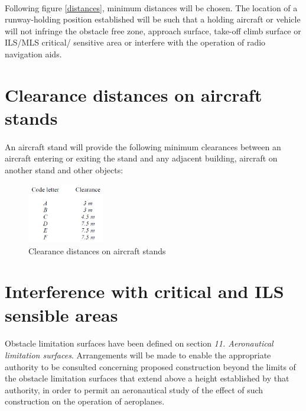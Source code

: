 	\paragraph{} Following figure \ref{distances}, minimum distances will be chosen. The location of a runway-holding position established will be such that a holding aircraft or vehicle will not infringe the obstacle free zone, approach surface, take-off climb surface or ILS/MLS critical/ sensitive area or interfere with the operation of radio navigation aids.
	
	\section{Clearance distances on aircraft stands}
	\paragraph{} An aircraft stand will provide the following minimum clearances between an aircraft entering or exiting the stand and any adjacent building, aircraft on another stand and other objects:
	
	\begin{figure}[H]
		\centering
		\includegraphics[clip, trim=0cm 0cm 0cm 0cm, width=0.3\textwidth]{./images/holding/clearances}
		\caption{Clearance distances on aircraft stands}
		\label{clearances}
	\end{figure}
	
	\section{Interference with critical and ILS sensible areas}
	\paragraph{} Obstacle limitation surfaces have been defined on section \textit{11. Aeronautical limitation surfaces}. Arrangements will be made to enable the appropriate authority to be consulted concerning proposed construction beyond the limits of the obstacle limitation surfaces that extend above a height established by that authority, in order to permit an aeronautical study of the effect of such construction on the operation of aeroplanes.
	
